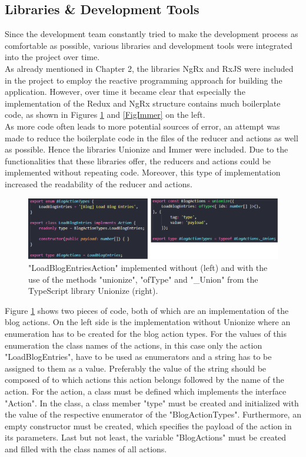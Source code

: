 \documentclass[Bachelor,BIF,english]{twbook}
\begin{document}
\subsection{Libraries \& Development Tools}
Since the development team constantly tried to make the development process as comfortable as possible, various libraries and development tools were integrated into the project over time.
\\[\baselineskip]
As already mentioned in Chapter 2, the libraries NgRx and RxJS were included in the project to employ the reactive programming approach for building the application. However, over time it became clear that especially the implementation of the Redux and NgRx structure contains much boilerplate code, as shown in Figures \ref{FigUnionize} and \ref{FigImmer} on the left.
\\[\baselineskip]
As more code often leads to more potential sources of error, an attempt was made to reduce the boilerplate code in the files of the reducer and actions as well as possible. Hence the libraries Unionize \cite{Unionize} and Immer \cite{Immer} were included. Due to the functionalities that these libraries offer, the reducers and actions could be implemented without repeating code. Moreover, this type of implementation increased the readability of the reducer and actions.
\begin{figure}[!htbp]
\centering
\includegraphics[width=1\linewidth]{PICs/without_and_with_unionize_actions.eps}
\caption{"LoadBlogEntriesAction" implemented without (left) and with the use of the methods "unionize", "ofType" and "\_Union" from the TypeScript library Unionize \cite{Unionize} (right).}\label{FigUnionize}
\end{figure}
Figure \ref{FigUnionize} shows two pieces of code, both of which are an implementation of the blog actions. On the left side is the implementation without Unionize where an enumeration has to be created for the blog action types. For the values of this enumeration the class names of the actions, in this case only the action "LoadBlogEntries", have to be used as enumerators and a string has to be assigned to them as a value. Preferably the value of the string should be composed of to which actions this action belongs followed by the name of the action. For the action, a class must be defined which implements the interface "Action". In the class, a class member "type" must be created and initialized with the value of the respective enumerator of the "BlogActionTypes". Furthermore, an empty constructor must be created, which specifies the payload of the action in its parameters. Last but not least, the variable "BlogActions" must be created and filled with the class names of all actions.
\end{document}

